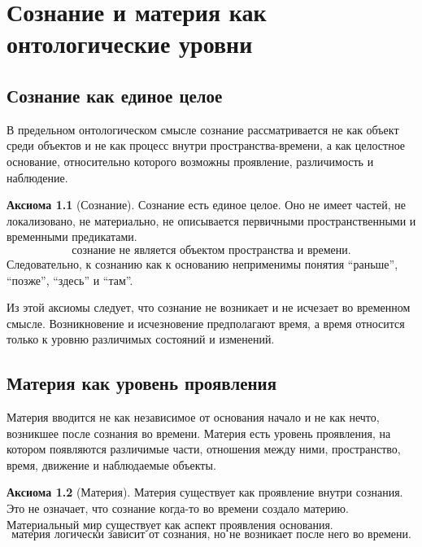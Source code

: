 \documentclass[12pt,a4paper,oneside]{book}
\theoremstyle{definition}
\newtheorem{axiom}{Аксиома}[chapter]
\theoremstyle{plain}
\theoremstyle{remark}
\begin{document}
\chapter{Сознание и материя как онтологические уровни}

\section{Сознание как единое целое}

В предельном онтологическом смысле сознание рассматривается не как объект среди
объектов и не как процесс внутри пространства-времени, а как целостное основание,
относительно которого возможны проявление, различимость и наблюдение.

\begin{axiom}[Сознание]
Сознание есть единое целое. Оно не имеет частей, не локализовано, не материально,
не описывается первичными пространственными и временными предикатами.
\[
\boxed{\text{сознание не является объектом пространства и времени.}}
\]
Следовательно, к сознанию как к основанию неприменимы понятия ``раньше'',
``позже'', ``здесь'' и ``там''.
\end{axiom}

Из этой аксиомы следует, что сознание не возникает и не исчезает во временном
смысле. Возникновение и исчезновение предполагают время, а время относится только
к уровню различимых состояний и изменений.

\section{Материя как уровень проявления}

Материя вводится не как независимое от основания начало и не как нечто, возникшее
после сознания во времени. Материя есть уровень проявления, на котором появляются
различимые части, отношения между ними, пространство, время, движение и наблюдаемые
объекты.

\begin{axiom}[Материя]
Материя существует как проявление внутри сознания. Это не означает, что сознание
когда-то во времени создало материю. Материальный мир существует как аспект
проявления основания.
\[
\boxed{\text{материя логически зависит от сознания, но не возникает после него во времени.}}
\]
\end{axiom}
\end{document}
